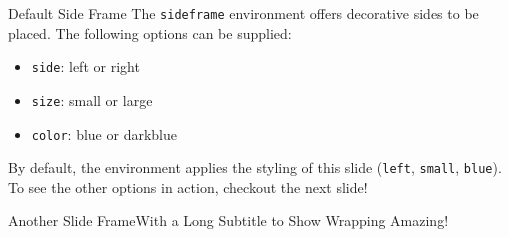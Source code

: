 \documentclass[aspectratio=169, 10pt]{beamer}
\begin{document}
    \begin{sideframe}{Default Side Frame}{}
        The \texttt{sideframe} environment offers decorative sides to be placed. The following options can be supplied:

        \begin{itemize}
            \item \texttt{side}: left or right
            \item \texttt{size}: small or large
            \item \texttt{color}: blue or darkblue
        \end{itemize}

        By default, the environment applies the styling of this slide (\texttt{left}, \texttt{small}, \texttt{blue}).
        To see the other options in action, checkout the next slide!

    \end{sideframe}

    \begin{sideframe}[side=right,size=large,color=darkblue]{Another Slide Frame}{With a Long Subtitle to Show Wrapping}
        Amazing!
    \end{sideframe}
\end{document}
